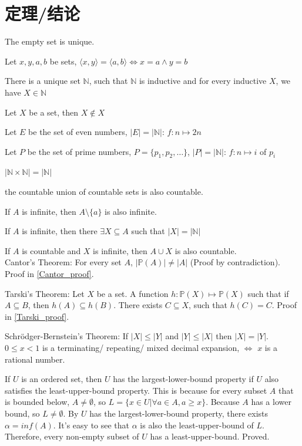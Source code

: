 \documentclass[12pt,a4paper]{ctexrep}
\begin{document}
\section{定理/结论}
The empty set is unique.

Let $x,y,a,b$ be sets, $\langle x,y \rangle = \langle a,b \rangle \iff x=a \wedge y=b$

There is a unique set $\mathbb{N}$, such that $\mathbb{N}$ is inductive and for every inductive $X$, we have $X\in \mathbb{N}$

Let $X$ be a set, then $X \notin X$

Let $E$ be the set of even numbers, $|E|=|\mathbb{N}|$: $f:n\mapsto 2n$

Let $P$ be the set of prime numbers, $P=\{p_1,p_2,\dots\}$, $|P|=|\mathbb{N}|$: $f:n \mapsto i$ of $p_i$

$|\mathbb{N} \times \mathbb{N}| = |\mathbb{N}|$

the countable union of countable sets is also countable.

If $A$ is infinite, then $A\setminus \{a\}$ is also infinite.

If $A$ is infinite, then there $\exists X \subseteq A$ such that $|X| = |\mathbb{N}|$

If $A$ is countable and $X$ is infinite, then $A \cup X$ is also countable.\\

Cantor's Theorem:
For every set $A$, $|\mathbb{P}(A)| \neq |A|$ (Proof by contradiction). Proof in \hyperlink{Cantor_proof}{\ref{Cantor_proof}}. \label{Cantor_theorem}\hypertarget{Cantor_theorem}{}

Tarski's Theorem:
Let $X$ be a set. A function $h: \mathbb{P}(X)\mapsto \mathbb{P}(X)$ such that if $A \subseteq B$, then $h(A) \subseteq h(B)$. There exists $C \subseteq X$, such that $h(C)=C$. Proof in \hyperlink{Tarski_proof}{\ref{Tarski_proof}}. \label{Tarski_theorem}\hypertarget{Tarski_theorem}{}

Schr\"odger-Bernstein's Theorem:
If $|X| \leqslant |Y|$ and $|Y| \leqslant |X|$ then $|X| = |Y|$.\\

$0\leqslant x < 1$ is a terminating/ repeating/ mixed decimal expansion, $\iff$ $x$ is a rational number.

If $U$ is an ordered set, then $U$ has the largest-lower-bound property if $U$ also satisfies the least-upper-bound property. This is because for every subset $A$ that is bounded below, $A \neq \emptyset$, so $L = \{x \in U| \forall a \in A, a \geq x\}$. Because $A$ has a lower bound, so $L \neq \emptyset$. By $U$ has the largest-lower-bound property, there exists $\alpha = inf(A)$. It's easy to see that $\alpha$ is also the least-upper-bound of $L$. Therefore, every non-empty subset of $U$ has a least-upper-bound. Proved.
\end{document}
